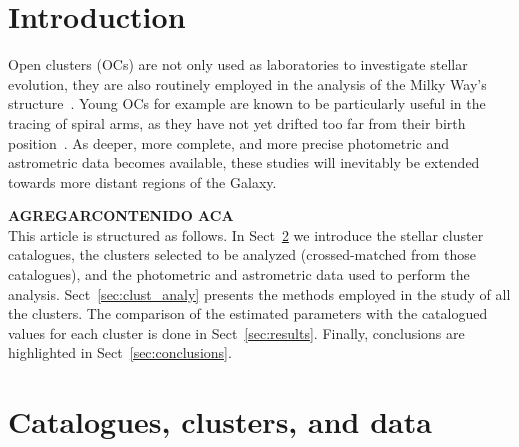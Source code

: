 \documentclass{aa}
\begin{document}

\maketitle


\section{Introduction}

 Open clusters (OCs) are not only used as laboratories to investigate stellar
 evolution, they are also routinely employed in the analysis of the Milky Way's
 structure~\citep{Loktin_1992,Moitinho_2006,Vazquez2008,Moitinho_2010}.
 Young OCs for example are known to be particularly
 useful in the tracing of spiral arms, as they have not yet drifted too far
 from their birth position~\citep{carraro_2013,Molina_2018}. As deeper, more
 complete, and more precise photometric and astrometric data becomes available,
 these studies will inevitably be extended towards more distant regions of the
 Galaxy.

 \textbf{AGREGARCONTENIDO ACA}\\

 This article is structured as follows. In Sect~\ref{sec:cat_clust_data} we
 introduce the stellar cluster catalogues, the clusters selected to be
 analyzed (crossed-matched from those catalogues), and the photometric and 
 astrometric data used to perform the analysis. Sect~\ref{sec:clust_analy}
 presents the methods employed in the study of all the clusters. The comparison
 of the estimated parameters with the catalogued values for each cluster is done
 in Sect~\ref{sec:results}. Finally, conclusions are highlighted in
 Sect~\ref{sec:conclusions}.





\section{Catalogues, clusters, and data}
 \label{sec:cat_clust_data}
\end{document}
